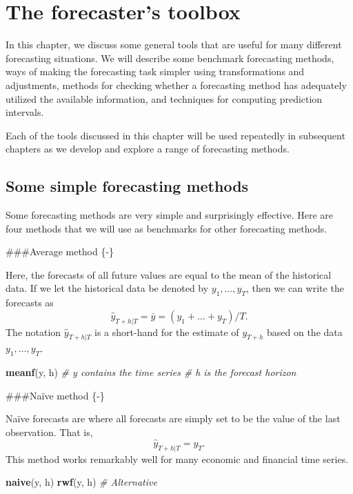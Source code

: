 \documentclass[]{book}
\newenvironment{Shaded}{\begin{snugshade}}{\end{snugshade}}
\newcommand{\CommentTok}[1]{\textcolor[rgb]{0.56,0.35,0.01}{\textit{#1}}}
\newcommand{\KeywordTok}[1]{\textcolor[rgb]{0.13,0.29,0.53}{\textbf{#1}}}
\newcommand{\NormalTok}[1]{#1}
\begin{document}
\hypertarget{ch-toolbox}{%
\chapter{The forecaster's toolbox}\label{ch-toolbox}}

In this chapter, we discuss some general tools that are useful for many different forecasting situations. We will describe some benchmark forecasting methods, ways of making the forecasting task simpler using transformations and adjustments, methods for checking whether a forecasting method has adequately utilized the available information, and techniques for computing prediction intervals.

Each of the tools discussed in this chapter will be used repeatedly in subsequent chapters as we develop and explore a range of forecasting methods.

\hypertarget{sec-2-methods}{%
\section{Some simple forecasting methods}\label{sec-2-methods}}

Some forecasting methods are very simple and surprisingly effective. Here are four methods that we will use as benchmarks for other forecasting methods.

\#\#\#Average method \{-\}

Here, the forecasts of all future values are equal to the mean of the historical data. If we let the historical data be denoted by \(y_{1},\dots,y_{T}\), then we can write the forecasts as
\[
  \hat{y}_{T+h|T} = \bar{y} = (y_{1}+\dots+y_{T})/T.
\]
The notation \(\hat{y}_{T+h|T}\) is a short-hand for the estimate of \(y_{T+h}\) based on the data \(y_1,\dots,y_T\).

\begin{Shaded}
\begin{Highlighting}[]
\KeywordTok{meanf}\NormalTok{(y, h)}
\CommentTok{# y contains the time series}
\CommentTok{# h is the forecast horizon}
\end{Highlighting}
\end{Shaded}

\#\#\#Naïve method \{-\}

Naïve forecasts are where all forecasts are simply set to be the value of the last observation. That is,
\[
  \hat{y}_{T+h|T} = y_{T}.
\]
This method works remarkably well for many economic and financial time series.

\begin{Shaded}
\begin{Highlighting}[]
\KeywordTok{naive}\NormalTok{(y, h)}
\KeywordTok{rwf}\NormalTok{(y, h) }\CommentTok{# Alternative}
\end{Highlighting}
\end{Shaded}
\end{document}
